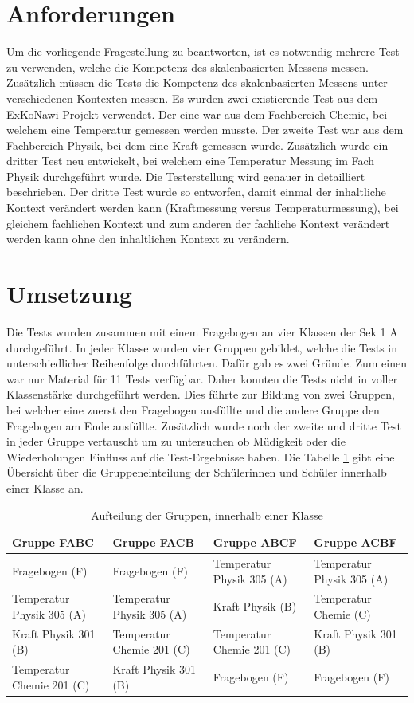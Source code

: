 
\section{Anforderungen}

Um die vorliegende Fragestellung zu beantworten, ist es notwendig mehrere Test zu verwenden, welche die Kompetenz des skalenbasierten Messens messen. Zusätzlich müssen die Tests die Kompetenz des skalenbasierten Messens unter verschiedenen Kontexten messen. Es wurden zwei existierende Test aus dem ExKoNawi Projekt verwendet. Der eine war aus dem Fachbereich Chemie, bei welchem eine Temperatur gemessen werden musste. Der zweite Test war aus dem Fachbereich Physik, bei dem eine Kraft gemessen wurde. Zusätzlich wurde ein dritter Test neu entwickelt, bei welchem eine Temperatur Messung im Fach Physik durchgeführt wurde. Die Testerstellung wird genauer in \citet{Sichau2015} detailliert beschrieben. Der dritte Test wurde so entworfen, damit einmal der inhaltliche Kontext verändert werden kann (Kraftmessung versus Temperaturmessung), bei gleichem fachlichen Kontext und zum anderen der fachliche Kontext verändert werden kann ohne den inhaltlichen Kontext zu verändern. 


\section{Umsetzung}

Die Tests wurden zusammen mit einem Fragebogen an vier Klassen der Sek 1 A durchgeführt. In jeder Klasse wurden vier Gruppen gebildet, welche die Tests in unterschiedlicher Reihenfolge durchführten. Dafür gab es zwei Gründe. Zum einen war nur Material für 11 Tests verfügbar. Daher konnten die Tests nicht in voller Klassenstärke durchgeführt werden. Dies führte zur Bildung von zwei Gruppen, bei welcher eine zuerst den Fragebogen ausfüllte und die andere Gruppe den Fragebogen am Ende ausfüllte. Zusätzlich wurde noch der zweite und dritte Test in jeder Gruppe vertauscht um zu untersuchen ob Müdigkeit oder die Wiederholungen Einfluss auf die Test-Ergebnisse haben. Die Tabelle \ref{tab:Gruppenaufteilung} gibt eine Übersicht über die Gruppeneinteilung der Schülerinnen und Schüler innerhalb einer Klasse an.
\begin{table}[htbp]
  \centering
  \begin{tabular}{|p{3.1cm}|p{3.1cm}|p{3.1cm}|p{3.1cm}|}
  \hline Gruppe FABC & Gruppe FACB & Gruppe ABCF & Gruppe ACBF \\ 
  \hline Fragebogen (F) & Fragebogen (F) & Temperatur Physik 305 (A) & Temperatur Physik 305 (A) \\ 
  \hline Temperatur Physik 305 (A) & Temperatur Physik 305 (A) & Kraft Physik (B) & Temperatur Chemie (C) \\ 
  \hline Kraft Physik 301 (B) & Temperatur Chemie 201 (C) & Temperatur Chemie 201 (C) & Kraft Physik 301 (B) \\ 
  \hline Temperatur Chemie 201 (C) & Kraft Physik 301 (B) & Fragebogen (F) & Fragebogen (F) \\ 
  \hline 
  \end{tabular} 
  \caption{Aufteilung der Gruppen, innerhalb einer Klasse}
  \label{tab:Gruppenaufteilung}
\end{table}

